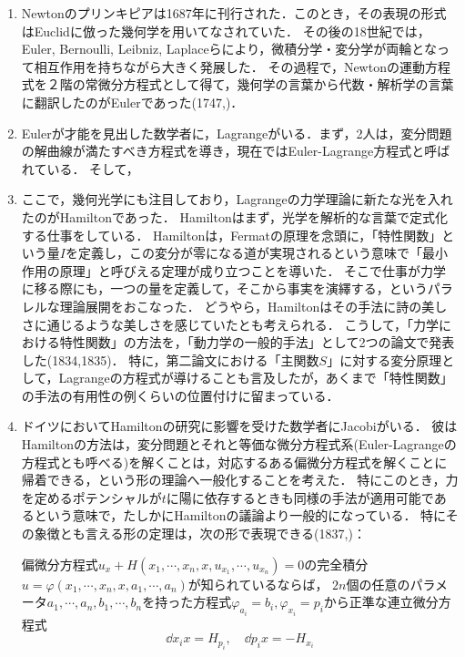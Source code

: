 \documentclass[uplatex, dvipdfmx]{jsreport}
\begin{document}
\begin{enumerate}
    \item Newtonのプリンキピアは1687年に刊行された．このとき，その表現の形式はEuclidに倣った幾何学を用いてなされていた．
    その後の18世紀では，Euler, Bernoulli, Leibniz, Laplaceらにより，微積分学・変分学が両輪となって相互作用を持ちながら大きく発展した．
    その過程で，Newtonの運動方程式を２階の常微分方程式として得て，幾何学の言葉から代数・解析学の言葉に翻訳したのがEulerであった(1747,\cite{Euler1747})．
    \item Eulerが才能を見出した数学者に，Lagrangeがいる．まず，2人は，変分問題の解曲線が満たすべき方程式を導き，現在ではEuler-Lagrange方程式と呼ばれている．
    そして，
    \item ここで，幾何光学にも注目しており，Lagrangeの力学理論に新たな光を入れたのがHamiltonであった．
    Hamiltonはまず，光学を解析的な言葉で定式化する仕事をしている．
    Hamiltonは，Fermatの原理を念頭に，「特性関数」という量$I$を定義し，この変分が零になる道が実現されるという意味で「最小作用の原理」と呼びえる定理が成り立つことを導いた．
    そこで仕事が力学に移る際にも，一つの量を定義して，そこから事実を演繹する，というパラレルな理論展開をおこなった．
    どうやら，Hamiltonはその手法に詩の美しさに通じるような美しさを感じていたとも考えられる．
    こうして，「力学における特性関数」の方法を，「動力学の一般的手法」として2つの論文で発表した(1834\cite{Hamilton34},1835\cite{Hamilton35})．
    特に，第二論文における「主関数$S$」に対する変分原理として，Lagrangeの方程式が導けることも言及したが，あくまで「特性関数」の手法の有用性の例くらいの位置付けに留まっている．
    \item ドイツにおいてHamiltonの研究に影響を受けた数学者にJacobiがいる．
    彼はHamiltonの方法は，変分問題とそれと等価な微分方程式系(Euler-Lagrangeの方程式とも呼べる)を解くことは，対応するある偏微分方程式を解くことに帰着できる，という形の理論へ一般化することを考えた．
    特にこのとき，力を定めるポテンシャルが$t$に陽に依存するときも同様の手法が適用可能であるという意味で，たしかにHamiltonの議論より一般的になっている．
    特にその象徴とも言える形の定理は，次の形で表現できる(1837,\cite{Jacobi37B})：
    \begin{theorem}
        偏微分方程式$u_x+H(x_1,\cdots,x_n,x,u_{x_1},\cdots,u_{x_n})=0$の完全積分$u=\varphi(x_1,\cdots,x_n,x,a_1,\cdots,a_n)$が知られているならば，
        $2n$個の任意のパラメータ$a_1,\cdots,a_n,b_1,\cdots,b_n$を持った方程式$\varphi_{a_i}=b_i,\varphi_{x_i}=p_i$から正準な連立微分方程式
        \[\dd{x_i}{x}=H_{p_i},\quad\dd{p_i}{x}=-H_{x_i}\]

\end{theorem}
\end{enumerate}
\end{document}

